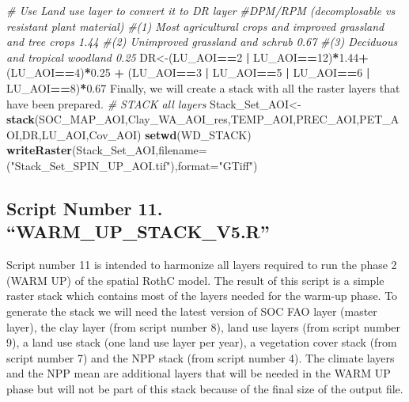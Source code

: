 \documentclass[
  10pt,
  b5paper,
]{book}
\newenvironment{Shaded}{\begin{snugshade}}{\end{snugshade}}
\newcommand{\CommentTok}[1]{\textcolor[rgb]{0.56,0.35,0.01}{\textit{#1}}}
\newcommand{\DataTypeTok}[1]{\textcolor[rgb]{0.13,0.29,0.53}{#1}}
\newcommand{\DecValTok}[1]{\textcolor[rgb]{0.00,0.00,0.81}{#1}}
\newcommand{\FloatTok}[1]{\textcolor[rgb]{0.00,0.00,0.81}{#1}}
\newcommand{\KeywordTok}[1]{\textcolor[rgb]{0.13,0.29,0.53}{\textbf{#1}}}
\newcommand{\NormalTok}[1]{#1}
\newcommand{\OperatorTok}[1]{\textcolor[rgb]{0.81,0.36,0.00}{\textbf{#1}}}
\newcommand{\StringTok}[1]{\textcolor[rgb]{0.31,0.60,0.02}{#1}}
\begin{document}
\begin{Shaded}
\begin{Highlighting}[]
\CommentTok{# Use Land use layer to convert it to DR layer }
\CommentTok{#DPM/RPM (decomplosable vs resistant plant material)}
\CommentTok{#(1) Most agricultural crops and improved grassland and tree crops 1.44 }
\CommentTok{#(2) Unimproved grassland and schrub 0.67}
\CommentTok{#(3) Deciduous and tropical woodland 0.25    }
\NormalTok{DR<-(LU_AOI}\OperatorTok{==}\DecValTok{2} \OperatorTok{|}\StringTok{ }\NormalTok{LU_AOI}\OperatorTok{==}\DecValTok{12}\NormalTok{)}\OperatorTok{*}\FloatTok{1.44}\OperatorTok{+}\StringTok{ }\NormalTok{(LU_AOI}\OperatorTok{==}\DecValTok{4}\NormalTok{)}\OperatorTok{*}\FloatTok{0.25} \OperatorTok{+}\StringTok{ }\NormalTok{(LU_AOI}\OperatorTok{==}\DecValTok{3} \OperatorTok{|}\StringTok{ }\NormalTok{LU_AOI}\OperatorTok{==}\DecValTok{5} \OperatorTok{|}\StringTok{ }\NormalTok{LU_AOI}\OperatorTok{==}\DecValTok{6} \OperatorTok{|}\StringTok{ }\NormalTok{LU_AOI}\OperatorTok{==}\DecValTok{8}\NormalTok{)}\OperatorTok{*}\FloatTok{0.67}
\NormalTok{ Finally, we will create a stack with all the raster layers that have been prepared.}
 \CommentTok{# STACK all layers}
\NormalTok{Stack_Set_AOI<-}\KeywordTok{stack}\NormalTok{(SOC_MAP_AOI,Clay_WA_AOI_res,TEMP_AOI,PREC_AOI,PET_AOI,DR,LU_AOI,Cov_AOI)}
\KeywordTok{setwd}\NormalTok{(WD_STACK)}
\KeywordTok{writeRaster}\NormalTok{(Stack_Set_AOI,}\DataTypeTok{filename=}\NormalTok{(}\StringTok{"Stack_Set_SPIN_UP_AOI.tif"}\NormalTok{),}\DataTypeTok{format=}\StringTok{"GTiff"}\NormalTok{)}
\end{Highlighting}
\end{Shaded}

\hypertarget{script-number-11.-warm_up_stack_v5.r}{%
\subsection{Script Number 11. ``WARM\_UP\_STACK\_V5.R''}\label{script-number-11.-warm_up_stack_v5.r}}

Script number 11 is intended to harmonize all layers required to run the phase 2 (WARM UP) of the spatial RothC model. The result of this script is a simple raster stack which contains most of the layers needed for the warm-up phase. To generate the stack we will need the latest version of SOC FAO layer (master layer), the clay layer (from script number 8), land use layers (from script number 9), a land use stack (one land use layer per year), a vegetation cover stack (from script number 7) and the NPP stack (from script number 4). The climate layers and the NPP mean are additional layers that will be needed in the WARM UP phase but will not be part of this stack because of the final size of the output file.
\end{document}
